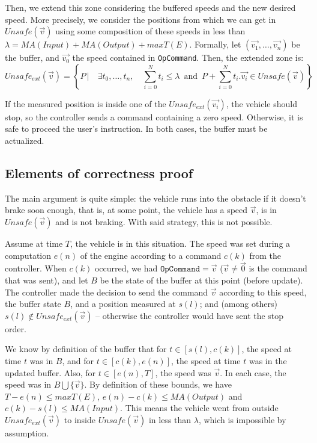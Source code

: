 Then, we extend this zone considering the buffered speeds and the new desired speed. More precisely, we consider the positions from which we can get in $Unsafe(\vec{v})$ using some composition of these speeds in less than $\lambda = MA(Input) + MA(Output) + maxT(E)$. 
Formally, let \mbox{$(\vec{v_1}, \dots, \vec{v_n})$} be the buffer, and $\vec{v_0}$ the speed contained in \texttt{OpCommand}. Then, the extended zone is:
\[Unsafe_{ext}(\vec{v}) = \left\{ P \,| \quad
\exists t_0, \dots, t_n, \quad \sum_{i=0}^N t_i \leq \lambda \, \textrm{ and } \,
P + \sum_{i=0}^N t_i.\vec{v_i} \in Unsafe(\vec{v}) \right\} \]

If the measured position is inside one of the $Unsafe_{ext}(\vec{v_i})$, the vehicle should stop, so the controller sends a command containing a zero speed. Otherwise, it is safe to proceed the user's instruction.
In both cases, the buffer must be actualized.


\subsection{Elements of correctness proof}

The main argument is quite simple: the vehicle runs into the obstacle if it doesn't brake soon enough, that is, at some point, the vehicle has a speed $\vec{v}$, is in $Unsafe(\vec{v})$ and is not braking.
With said strategy, this is not possible.

Assume at time $T$, the vehicle is in this situation. The speed was set during a computation $e(n)$ of the engine according to a command $c(k)$ from the controller.
When $c(k)$ occurred, we had $\texttt{OpCommand} = \vec{v}$ ($\vec{v} \neq \vec{0}$ is the command that was sent), and let $B$ be the state of the buffer at this point (before update).
The controller made the decision to send the command $\vec{v}$ according to this speed, the buffer state $B$, and a position measured at $s(l)$; and (among others) $s(l) \notin Unsafe_{ext}(\vec{v})$ -- otherwise the controller would have sent the stop order.

We know by definition of the buffer that for $t \in [s(l), c(k)]$, the speed at time $t$ was in $B$,
and for $t \in [c(k), e(n)]$, the speed at time $t$ was in the updated buffer. Also, for $t \in [e(n), T]$, the speed was $\vec{v}$. 
In each case, the speed was in $B \bigcup \{ \vec{v} \}$.
By definition of these bounds, we have $T - e(n) \leq maxT(E)$, $e(n) - c(k) \leq MA(Output)$ and $c(k) - s(l) \leq MA(Input)$.
This means the vehicle went from outside $Unsafe_{ext}(\vec{v})$ to inside $Unsafe(\vec{v})$ in less than $\lambda$, which is impossible by assumption.



